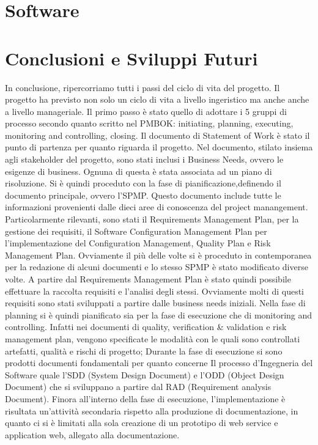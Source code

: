 \documentclass[conference]{IEEEtran}
\begin{document}
\section{Software}
\label{software}



\section{Conclusioni e Sviluppi Futuri}
In conclusione, ripercorriamo tutti i passi del ciclo di vita del progetto.
Il progetto ha previsto non solo un ciclo di vita a livello ingeristico ma anche anche a livello manageriale. Il primo passo \`{e} stato quello di adottare i 5 gruppi di processo secondo quanto scritto nel PMBOK: initiating, planning, executing, monitoring and controlling, closing.
Il documento di Statement of Work \`{e} stato il punto di partenza per quanto riguarda il progetto. Nel documento, stilato insiema agli stakeholder del progetto, sono stati inclusi i Business Needs, ovvero le esigenze di business. Ognuna di questa \`{e} stata associata ad un piano di risoluzione.
Si \`{e} quindi proceduto con la fase di pianificazione,definendo il documento principale, ovvero l\rq SPMP. Questo documento include tutte le informazioni provenienti dalle dieci aree di conoscenza del project manangement. Particolarmente rilevanti, sono stati il Requirements Management Plan, per la gestione dei requisiti, il Software Configuration Management Plan per l\rq implementazione del Configuration Management, Quality Plan e Risk Management Plan.
Ovviamente il pi\`{u} delle volte si \`{e} proceduto in contemporanea per la redazione di alcuni documenti e lo stesso SPMP \`{e} stato modificato diverse volte.
A partire dal Requirements Management Plan \`{e} stato quindi possibile effettuare la raccolta requisiti e l\rq analisi degli stessi. Ovviamente molti di questi requisiti sono stati sviluppati a partire dalle business needs iniziali. 
Nella fase di planning si \`{e} quindi pianificato sia per la fase di esecuzione che di monitoring and controlling. Infatti nei documenti di quality, verification \& validation e risk management plan, vengono specificate le modalità con le quali sono controllati artefatti, qualità e rischi di progetto; 
Durante la fase di esecuzione si sono prodotti documenti fondamentali per quanto concerne Il processo d\rq Ingegneria del Software quale l\rq SDD (System Design Document) e l\rq ODD (Object Design Document) che si sviluppano a partire dal RAD (Requirement analysis Document).
Finora all’interno della fase di esecuzione, l’implementazione è risultata un\rq attività secondaria rispetto alla produzione di documentazione, in quanto ci si \`{e} limitati alla sola creazione di un prototipo di web service e application web, allegato alla documentazione.
\end{document}
